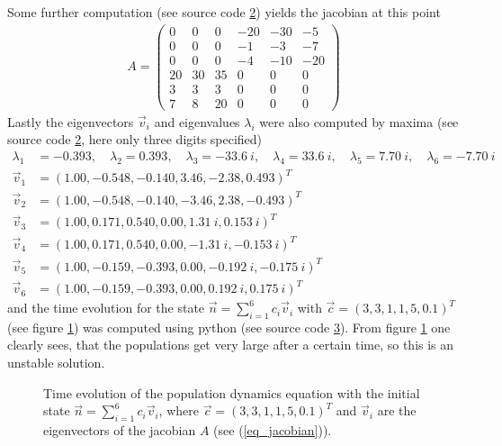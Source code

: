 \documentclass[12pt, a4paper]{article}
\begin{document}
  Some further computation (see source code \ref{code_maxima}) yields the jacobian at this point
  \begin{align}
    A = \begin{pmatrix}0 & 0 & 0 & -20 & -30 & -5\\
      0 & 0 & 0 & -1 & -3 & -7\\
      0 & 0 & 0 & -4 & -10 & -20\\
      20 & 30 & 35 & 0 & 0 & 0\\
      3 & 3 & 3 & 0 & 0 & 0\\
      7 & 8 & 20 & 0 & 0 & 0\end{pmatrix}
      \label{eq_jacobian}
  \end{align}
  Lastly the eigenvectors $\vec{v}_i$ and eigenvalues $\lambda_i$ were also computed by maxima (see source code \ref{code_maxima}, here only three digits specified)
  \begin{align}
    \lambda_1 &= -0.393, \quad
    \lambda_2 = 0.393, \quad
    \lambda_3 = -33.6 \ i, \quad
    \lambda_4 = 33.6 \ i, \quad
    \lambda_5 = 7.70 \ i, \quad
    \lambda_6 = -7.70 \ i \nonumber \\
    \vec{v}_1 &= (1.00, -0.548, -0.140, 3.46, -2.38, 0.493)^T \nonumber \\
    \vec{v}_2 &= (1.00, -0.548, -0.140, -3.46, 2.38, -0.493)^T \nonumber \\
    \vec{v}_3 &= (1.00, 0.171, 0.540, 0.00, 1.31 \ i, 0.153 \ i)^T \nonumber \\
    \vec{v}_4 &= (1.00, 0.171, 0.540, 0.00, -1.31 \ i, -0.153 \ i)^T \nonumber \\
    \vec{v}_5 &= (1.00, -0.159, -0.393, 0.00, -0.192 \ i, -0.175 \ i)^T \nonumber \\
    \vec{v}_6 &= (1.00, -0.159, -0.393, 0.00, 0.192 \ i, 0.175 \ i)^T
  \end{align}
  and the time evolution for the state $\vec{n} = \sum_{i=1}^6 c_i \vec{v}_i$ with $\vec{c} = (3, 3, 1, 1, 5, 0.1)^T$ (see figure \ref{fig_time_evolution}) was computed using python (see source code \ref{code_python}). From figure \ref{fig_time_evolution} one clearly sees, that the populations get very large after a certain time, so this is an unstable solution.

  \begin{figure}[h]
    
    \caption{
      Time evolution of the population dynamics equation with the initial state $\vec{n} = \sum_{i=1}^6 c_i \vec{v}_i$, where $\vec{c} = (3, 3, 1, 1, 5, 0.1)^T$ and $\vec{v}_i$ are the eigenvectors of the jacobian $A$ (see (\ref{eq_jacobian})).
    }
    \label{fig_time_evolution}
  \end{figure}

  \begin{figure}[h]
    \inputminted{text}{problem2_maxima.txt}
    \label{code_maxima}
  \end{figure}

  \begin{figure}[h]
    \inputminted{python}{problem2.py}
    \label{code_python}
  \end{figure}
\end{document}

